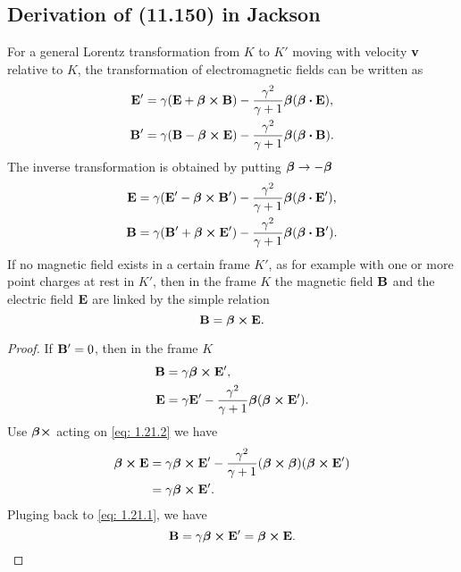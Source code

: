 \documentclass[10pt]{article}
\begin{document}
\subsection{Derivation of (11.150) in Jackson}
For a general Lorentz transformation from $K$ to $K'$ moving with velocity $\vb{v}$ relative to $K$, the transformation of electromagnetic fields can be written as
\begin{align*}
	\vb{E'} &= \gamma(\vb{E} + \vb*{\beta} \cross \vb{B}) - \frac{\gamma^2}{\gamma + 1} \vb*{\beta} (\vb*{\beta} \vdot \vb{E}), \\
	\vb{B'} &= \gamma(\vb{B} - \vb*{\beta} \cross \vb{E}) - \frac{\gamma^2}{\gamma + 1} \vb*{\beta} (\vb*{\beta} \vdot \vb{B}).
\end{align*}
The inverse transformation is obtained by putting $\vb*{\beta} \to -\vb*{\beta}$
\begin{align*}
	\vb{E} &= \gamma(\vb{E'} - \vb*{\beta} \cross \vb{B'}) - \frac{\gamma^2}{\gamma + 1} \vb*{\beta} (\vb*{\beta} \vdot \vb{E'}), \\
	\vb{B} &= \gamma(\vb{B'} + \vb*{\beta} \cross \vb{E'}) - \frac{\gamma^2}{\gamma + 1} \vb*{\beta} (\vb*{\beta} \vdot \vb{B'}).
\end{align*}
If no magnetic field exists in a certain frame $K'$, as for example with one or more point charges at rest in $K'$, then in the frame $K$ the magnetic field $\vb{B}$ and the electric field $\vb{E}$ are linked by the simple relation
\begin{equation}
	\vb{B} = \vb*{\beta} \cross \vb{E}.
\end{equation}
\begin{proof}
	If $\vb{B'}=0$, then in the frame $K$
	\begin{align}
		\vb{B} &= \gamma \vb*{\beta} \cross \vb{E'}, \label{eq: 1.21.1}\\
		\vb{E} &= \gamma \vb{E'} - \frac{\gamma^2}{\gamma +1} \vb*{\beta} (\vb*{\beta} \cross \vb{E'}). \label{eq: 1.21.2}
	\end{align}
	Use $\vb*{\beta} \cross $ acting on \eqref{eq: 1.21.2} we have
	\begin{align*}
		\vb*{\beta} \cross \vb{E} &= \gamma \vb*{\beta} \cross\vb{E'} - \frac{\gamma^2}{\gamma +1} (\vb*{\beta} \cross\vb*{\beta}) (\vb*{\beta} \cross \vb{E'}) \\
		&= \gamma \vb*{\beta} \cross\vb{E'}.
	\end{align*}
	Pluging back to \eqref{eq: 1.21.1}, we have
	\begin{equation}
		\vb{B} = \gamma \vb*{\beta} \cross \vb{E'} = \vb*{\beta} \cross \vb{E}.
	\end{equation}

\end{proof}
\end{document}
